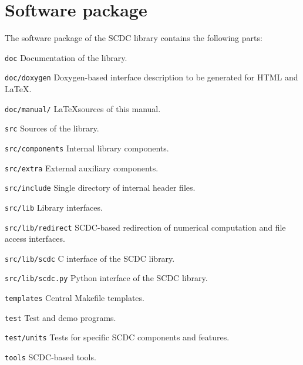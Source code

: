 \section{Software package}

The software package of the SCDC library contains the following parts:
\begin{codedesc}
  \item[\texttt{doc}] Documentation of the library.
  \item[\texttt{doc/doxygen}] Doxygen-based interface description to be generated for HTML and \LaTeX.
  \item[\texttt{doc/manual/}] \LaTeX sources of this manual.
  \item[\texttt{src}] Sources of the library.
  \item[\texttt{src/components}] Internal library components.
  \item[\texttt{src/extra}] External auxiliary components.
  \item[\texttt{src/include}] Single directory of internal header files.
  \item[\texttt{src/lib}] Library interfaces.
  \item[\texttt{src/lib/redirect}] SCDC-based redirection of numerical computation and file access interfaces.
  \item[\texttt{src/lib/scdc}] C interface of the SCDC library.
  \item[\texttt{src/lib/scdc.py}] Python interface of the SCDC library.
  \item[\texttt{templates}] Central Makefile templates.
  \item[\texttt{test}] Test and demo programs.
  \item[\texttt{test/units}] Tests for specific SCDC components and features.
  \item[\texttt{tools}] SCDC-based tools.
\end{codedesc}
